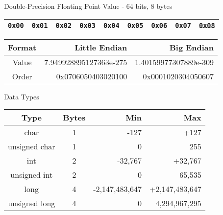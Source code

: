 \documentclass{beamer}
\begin{document}
\begin{frame}{Double-Precision Floating Point Value - 64 bits, 8 bytes}

\begin{table}[]
\begin{tabular}{|l|l|l|l|l|l|l|l|l|}
\hline
 \color{red}\texttt{0x00} & \color{red}\texttt{0x01} & \color{red}\texttt{0x02} & \color{red}\texttt{0x03} & \color{red}\texttt{0x04} & \color{red}\texttt{0x05} & \color{red}\texttt{0x06} & \color{red}\texttt{0x07} &
 \sout{\texttt{0x08}} \\
\hline 
\end{tabular}
\end{table}

\begin{table}[]
\begin{tabular}{c r r}
Format & Little Endian & Big Endian \\
\hline
Value &  7.949928895127363e-275   & 1.40159977307889e-309 \\
Order & 0x0706050403020100 & 0x0001020304050607
\end{tabular}
\end{table}

\end{frame}

\begin{frame}{Data Types}
\begin{table}[]
\begin{tabular}{c c r r}
Type & Bytes & Min & Max \\
\hline
char & 1 & -127 & +127 \\
unsigned char & 1 & 0 & 255 \\
int & 2 & -32,767 & +32,767   \\
unsigned int & 2 & 0 & 65,535 \\
long & 4 & -2,147,483,647 & +2,147,483,647 \\
unsigned long & 4 & 0 & 4,294,967,295 \\
\end{tabular}
\end{table}
\end{frame}
\end{document}
